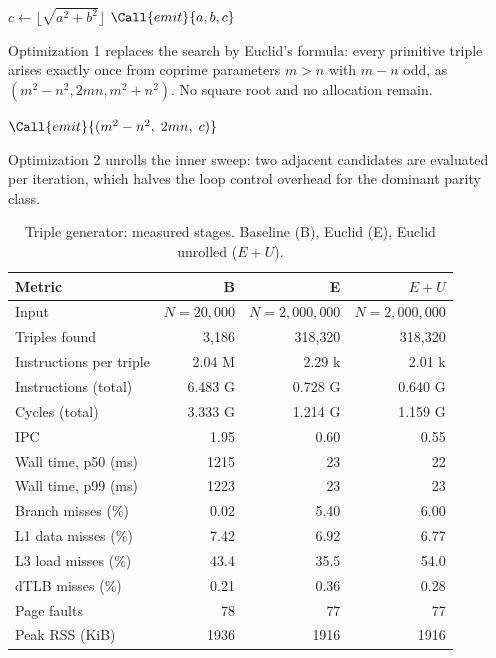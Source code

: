 \begin{algorithm}[t]
\caption{Baseline: the triple generator (before).}
\begin{algorithmic}[1]
    \State $c \gets \lfloor \sqrt{a^2+b^2} \rfloor$ 
      \State $\Call{emit}{a, b, c}$ 
    \EndIf
  \EndFor
\EndFor
\end{algorithmic}
\end{algorithm}

Optimization 1 replaces the search by Euclid's formula: every
primitive triple arises exactly once from coprime parameters $m > n$
with $m - n$ odd, as $(m^2 - n^2, 2mn, m^2 + n^2)$. No square root
and no allocation remain.

\begin{algorithm}[t]
\caption{Optimization 1: Euclid's formula (after).}
\begin{algorithmic}[1]
      \State $\Call{emit}{(m^2-n^2,\; 2mn,\; c)}$
    \EndIf
  \EndFor
\EndFor
\end{algorithmic}
\end{algorithm}

Optimization 2 unrolls the inner sweep: two adjacent candidates are
evaluated per iteration, which halves the loop control overhead for
the dominant parity class.

\begin{table}[t]
\centering
\caption{Triple generator: measured stages. Baseline (B), Euclid
(E), Euclid unrolled ($E+U$).}
\label{tab:demo2}
\begin{tabular}{lrrr}
\toprule
Metric & B & E & $E+U$\\
\midrule
Input & $N = 20{,}000$ & $N = 2{,}000{,}000$ & $N = 2{,}000{,}000$\\
Triples found & 3{,}186 & 318{,}320 & 318{,}320\\
Instructions per triple & 2.04 M & 2.29 k & 2.01 k\\
Instructions (total) & 6.483 G & 0.728 G & 0.640 G\\
Cycles (total) & 3.333 G & 1.214 G & 1.159 G\\
IPC & 1.95 & 0.60 & 0.55\\
Wall time, p50 (ms) & 1215 & 23 & 22\\
Wall time, p99 (ms) & 1223 & 23 & 23\\
Branch misses (\%) & 0.02 & 5.40 & 6.00\\
L1 data misses (\%) & 7.42 & 6.92 & 6.77\\
L3 load misses (\%) & 43.4 & 35.5 & 54.0\\
dTLB misses (\%) & 0.21 & 0.36 & 0.28\\
Page faults & 78 & 77 & 77\\
Peak RSS (KiB) & 1936 & 1916 & 1916\\
\bottomrule
\end{tabular}
\end{table}

